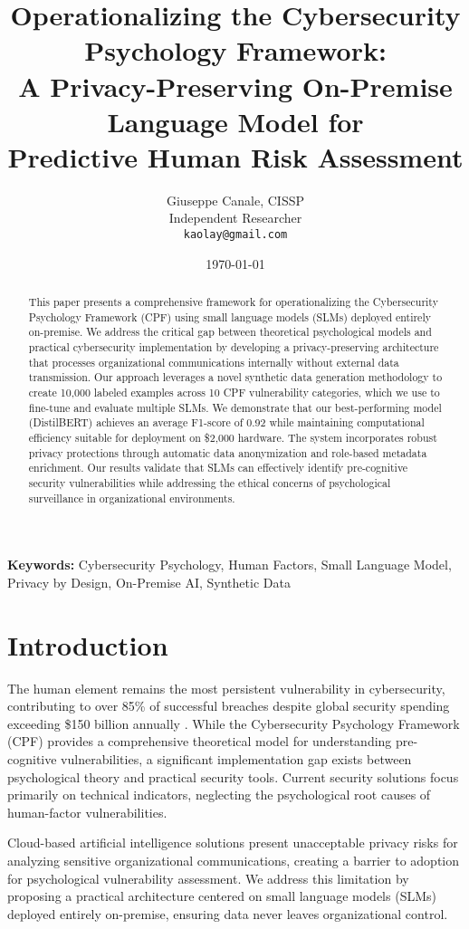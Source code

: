 \documentclass[11pt,a4paper]{article}
\title{Operationalizing the Cybersecurity Psychology Framework: \\ A Privacy-Preserving On-Premise Language Model for \\ Predictive Human Risk Assessment}
\author{
    Giuseppe Canale, CISSP \\
    Independent Researcher \\
    \texttt{kaolay@gmail.com}  
}
\date{\today}
\begin{document}
\maketitle

\begin{abstract}
This paper presents a comprehensive framework for operationalizing the Cybersecurity Psychology Framework (CPF) using small language models (SLMs) deployed entirely on-premise. We address the critical gap between theoretical psychological models and practical cybersecurity implementation by developing a privacy-preserving architecture that processes organizational communications internally without external data transmission. Our approach leverages a novel synthetic data generation methodology to create 10,000 labeled examples across 10 CPF vulnerability categories, which we use to fine-tune and evaluate multiple SLMs. We demonstrate that our best-performing model (DistilBERT) achieves an average F1-score of 0.92 while maintaining computational efficiency suitable for deployment on \$2,000 hardware. The system incorporates robust privacy protections through automatic data anonymization and role-based metadata enrichment. Our results validate that SLMs can effectively identify pre-cognitive security vulnerabilities while addressing the ethical concerns of psychological surveillance in organizational environments.

\end{abstract}

\textbf{Keywords:} Cybersecurity Psychology, Human Factors, Small Language Model, Privacy by Design, On-Premise AI, Synthetic Data

\section{Introduction}
The human element remains the most persistent vulnerability in cybersecurity, contributing to over 85\% of successful breaches despite global security spending exceeding \$150 billion annually \cite{verizon2023, gartner2023}. While the Cybersecurity Psychology Framework (CPF) \cite{canale2025cpf} provides a comprehensive theoretical model for understanding pre-cognitive vulnerabilities, a significant implementation gap exists between psychological theory and practical security tools. Current security solutions focus primarily on technical indicators, neglecting the psychological root causes of human-factor vulnerabilities.

Cloud-based artificial intelligence solutions present unacceptable privacy risks for analyzing sensitive organizational communications, creating a barrier to adoption for psychological vulnerability assessment. We address this limitation by proposing a practical architecture centered on small language models (SLMs) deployed entirely on-premise, ensuring data never leaves organizational control.
\end{document}

